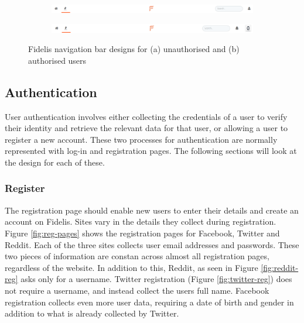 \begin{figure}[H]
\centering
\begin{subfigure}{1\linewidth}
	\includegraphics[width=1\linewidth]{Images/Design/nav-unauthorised}
	\caption{}
	\label{fig:nav-unauth}
\end{subfigure}
\begin{subfigure}{1\linewidth}
	\includegraphics[width=1\linewidth]{Images/Design/nav-authorised}
	\caption{}
	\label{fig:nav-auth}
\end{subfigure}
\caption{Fidelis navigation bar designs for (a) unauthorised and (b) authorised users}
\label{fig:fidelis-navs}
\end{figure}

\subsection{Authentication}
User authentication involves either collecting the credentials of a user to verify their identity and retrieve the relevant data for that user, or allowing a user to register a new account. These two processes for authentication are normally represented with log-in and registration pages. The following sections will look at the design for each of these.

\subsubsection{Register}
The registration page should enable new users to enter their details and create an account on Fidelis. Sites vary in the details they collect during registration. Figure \ref{fig:reg-pages} shows the registration pages for Facebook, Twitter and Reddit. Each of the three sites collects user email addresses and passwords. These two pieces of information are constan across almost all registration pages, regardless of the website. In addition to this, Reddit, as seen in Figure \ref{fig:reddit-reg} asks only for a username. Twitter registration (Figure \ref{fig:twitter-reg}) does not require a username, and instead collect the users full name. Facebook registration collects even more user data, requiring a date of birth and gender in addition to what is already collected by Twitter. 

